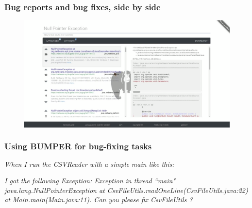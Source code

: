 \documentclass{beamer}
\begin{document}
\begin{frame}

  \frametitle{Bug reports and bug fixes, side by side}

  \begin{figure}
    \centering
    \includegraphics[width=1\textwidth]{../media/interface2.png}
  \end{figure}

\end{frame}

\begin{frame}

  \frametitle{Using BUMPER for bug-fixing tasks}

  \textit{When I run the CSVReader with a simple main like this:}

  \noindent\begin{minipage}{0.90\linewidth}

   

  \end{minipage}

  \textit{I got the following Exception: Exception in thread ``main" java.lang.NullPointerException at CsvFileUtils.readOneLine(CsvFileUtils.java:22) at Main.main(Main.java:11). Can you please fix CsvFileUtils ?}
\end{frame}
\end{document}
